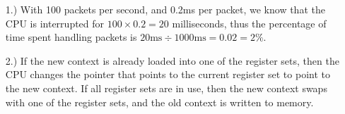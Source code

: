 \documentclass[12pt]{article}
\begin{document}
    \pagestyle{fancy}


    \begin{itemize}
        \item [1.)] With 100 packets per second, and 0.2ms per packet, we know
        that the CPU is interrupted for $100 \times 0.2 = 20$ milliseconds,
        thus the percentage of time spent handling packets is
        $20\text{ms} \div 1000\text{ms} = 0.02 = 2\%$.

        \item [2.)] If the new context is already loaded into one of the
        register sets, then the CPU changes the pointer that points
        to the current register set to point to the new context.
        If all register sets are in use, then the new context swaps with
        one of the register sets, and the old context is written to memory.


\end{itemize}
\end{document}

